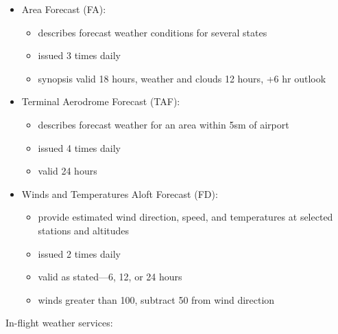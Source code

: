 \documentclass[twoside,openright]{report}
\begin{document}
\begin{itemize}
  \item Area Forecast (FA):
    \begin{itemize}
      \item describes forecast weather conditions for several states
      \item issued 3 times daily
      \item synopsis valid 18 hours, weather and clouds 12 hours, +6 hr outlook
    \end{itemize}
  \item Terminal Aerodrome Forecast (TAF):
    \begin{itemize}
      \item describes forecast weather for an area within 5sm of airport
      \item issued 4 times daily
      \item valid 24 hours
    \end{itemize}
  \item Winds and Temperatures Aloft Forecast (FD):
    \begin{itemize}
      \item provide estimated wind direction, speed, and temperatures at
        selected stations and altitudes
      \item issued 2 times daily
      \item valid as stated—6, 12, or 24 hours
      \item winds greater than 100, subtract 50 from wind direction
    \end{itemize}
\end{itemize}

In-flight weather services:
\end{document}
